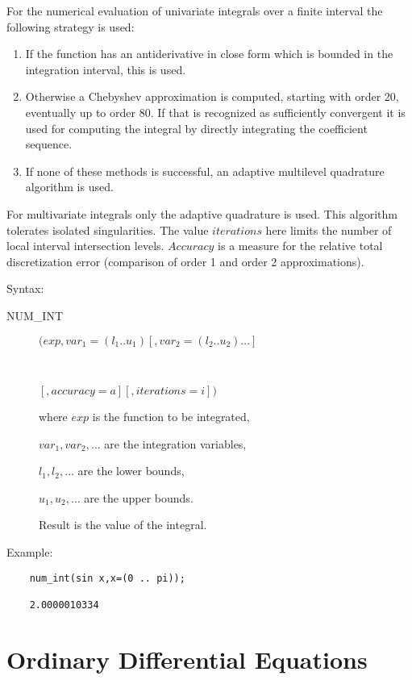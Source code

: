 For the numerical evaluation of univariate integrals over a finite
interval the following strategy is used:
\begin{enumerate}
\item If the function has an antiderivative in close form
    which is bounded in the integration interval, this
    is used.
\item Otherwise a Chebyshev approximation is computed,
    starting with order 20, eventually up to order 80.
    If that is recognized as sufficiently convergent
    it is used for computing the integral by directly
    integrating the coefficient sequence.
\item If none of these methods is successful, an
    adaptive multilevel quadrature algorithm is used.
\end{enumerate}
For multivariate integrals only the adaptive quadrature is used.
This algorithm tolerates isolated singularities.
The value $iterations$ here limits the number of
local interval intersection levels.
$Accuracy$ is a measure for the relative total discretization
error (comparison of order 1 and order 2 approximations).

Syntax:

\begin{description}
\item[NUM\_INT] $(exp,var_1=(l_1 .. u_1)[,var_2=(l_2 .. u_2)\ldots]$
\item[\ \ \ \ \ \ ]$[,accuracy=a][,iterations=i])$

where $exp$ is the function to be integrated,

$var_1, var_2 , \ldots$ are the integration variables,

$l_1, l_2 , \ldots$ are the lower bounds,

$u_1, u_2 , \ldots$ are the upper bounds.

Result is the value of the integral.

\end{description}

Example:

\begin{verbatim}
    num_int(sin x,x=(0 .. pi));

    2.0000010334
\end{verbatim}

\section{Ordinary Differential Equations}

